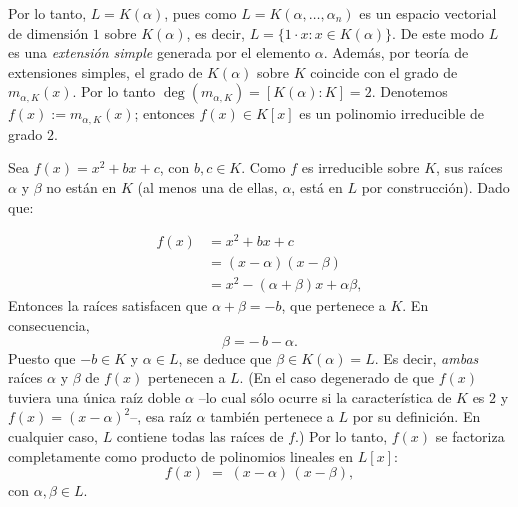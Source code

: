 \begin{solucion}


Por lo tanto, $L = K(\alpha)$, pues como $L=K(\alpha,\dots,\alpha_n)$ es un espacio vectorial de dimensión $1$ sobre $K(\alpha)$, es decir, $L = \{1 \cdot x: x \in K(\alpha)\}$. De este modo $L$ es una \emph{extensión simple} generada por el elemento $\alpha$. Además, por teoría de extensiones simples, el grado de $K(\alpha)$ sobre $K$ coincide con el grado de $m_{\alpha,K}(x)$. Por lo tanto $\deg(m_{\alpha,K}) = [K(\alpha):K] = 2$. Denotemos $f(x) := m_{\alpha,K}(x)$; entonces $f(x) \in K[x]$ es un polinomio irreducible de grado $2$. 

Sea $f(x) = x^2 + bx + c$, con $b,c \in K$. Como $f$ es irreducible sobre $K$, sus raíces $\alpha$ y $\beta$ no están en $K$ (al menos una de ellas, $\alpha$, está en $L$ por construcción). Dado que:

\begin{align*}
f(x) &= x^2 + bx + c \\
&= (x - \alpha)(x - \beta)\\
&= x^2 - (\alpha + \beta)x + \alpha\beta,
\end{align*}
Entonces la raíces satisfacen que $\alpha + \beta = -b$, que pertenece a $K$. En consecuencia, 
\[ \beta = -\,b - \alpha. \] 
Puesto que $-b \in K$ y $\alpha \in L$, se deduce que $\beta \in K(\alpha) = L$. Es decir, \emph{ambas} raíces $\alpha$ y $\beta$ de $f(x)$ pertenecen a $L$. (En el caso degenerado de que $f(x)$ tuviera una única raíz doble $\alpha$ --lo cual sólo ocurre si la característica de $K$ es $2$ y $f(x)=(x-\alpha)^2$--, esa raíz $\alpha$ también pertenece a $L$ por su definición. En cualquier caso, $L$ contiene todas las raíces de $f$.) Por lo tanto, $f(x)$ se factoriza completamente como producto de polinomios lineales en $L[x]$: 
\[ f(x) \;=\; (x-\alpha)\,(x-\beta) , \] 
con $\alpha,\beta \in L$. 


\end{solucion}
